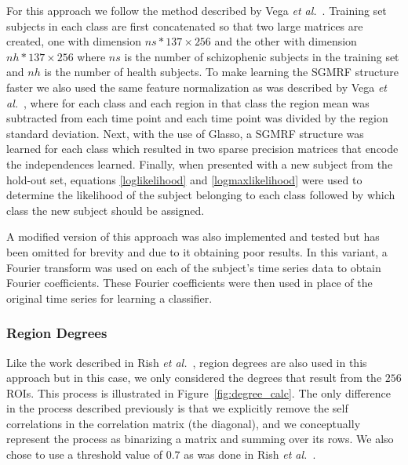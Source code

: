 \documentclass{article} %
\begin{document}
For this approach we follow the method described by Vega \emph{et al.}~\cite{rvega}.
Training set subjects in each class are first concatenated so that two large 
matrices are created, one with dimension $ns * 137 \times 256$ and the other 
with dimension $nh * 137 \times 256$ where $ns$ is the number of schizophenic 
subjects in the training set and $nh$ is the number of health subjects. To
make learning the SGMRF structure faster we also used the same feature 
normalization as was described by Vega \emph{et al.}~\cite{rvega},
where for each class and each region in that class the region mean was 
subtracted from each time point and each time point was divided by the 
region standard deviation. Next, with the use of Glasso, a SGMRF structure was 
learned for each class which resulted in two sparse precision matrices that 
encode the independences learned. Finally, when presented with a new subject 
from the hold-out set, equations \eqref{loglikelihood} and 
\eqref{logmaxlikelihood} were used to determine the likelihood of the subject 
belonging to each class followed by which class the new subject should be 
assigned.

A modified version of this approach was also implemented and tested but has
been omitted for brevity and due to it obtaining poor results. In this variant,
a Fourier transform was used on each of the subject's time series data to 
obtain Fourier coefficients. These Fourier coefficients were then used in 
place of the original time series for learning a classifier.


\subsubsection{Region Degrees}

Like the work described in Rish \emph{et al.}~\cite{rish2009discriminative}, 
region degrees are also used in this approach but in this case, we only 
considered the degrees that result from the $256$ ROIs. This process is 
illustrated in Figure~\ref{fig:degree_calc}. The only difference in the
process described previously is that we explicitly remove the self 
correlations in the correlation matrix (the diagonal), and we conceptually
represent the process as binarizing a matrix and summing over its rows.
We also chose to use a threshold value of $0.7$ as was done in Rish 
\emph{et al.}~\cite{rish2009discriminative}.
\end{document}
